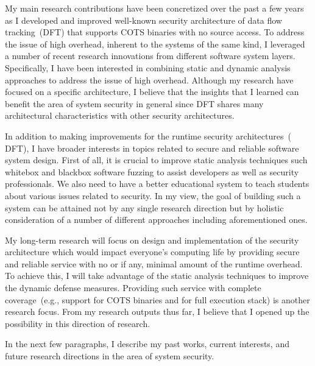 \documentclass[letterpaper, 10pt]{article}
\begin{document}
\begin{small}
My main research contributions have been concretized over the past a few years
as I developed and improved well-known security architecture of data flow
tracking~(DFT) that supports COTS binaries with no source access.
%
To address the issue of high overhead, inherent to the systems of the same
kind, I leveraged a number of recent research innovations from different
software system layers. Specifically, I have been interested in combining
static and dynamic analysis approaches to address the issue of high overhead.
%
Although my research have focused on a specific architecture, I believe that
the insights that I learned can benefit the area of system security in general
since DFT shares many architectural characteristics with other security
architectures.

In addition to making improvements for the runtime security architectures~(\ie
DFT), I have broader interests in topics related to secure and reliable
software system design.
%
First of all, it is crucial to improve static analysis techniques such whitebox
and blackbox software fuzzing to assist developers as well as security
professionals. 
%
We also need to have a better educational system to teach students about
various issues related to security.
%
In my view, the goal of building such a system can be attained not by any
single research direction but by holistic consideration of a number of
different approaches including aforementioned ones.

My long-term research will focus on design and implementation of the security
architecture which would impact everyone's computing life by providing secure
and reliable service with no or if any, minimal amount of the runtime overhead.
To achieve this, I will take advantage of the static analysis techniques to
improve the dynamic defense measures. 
%
%
%
Providing such service with complete coverage~(e.g., support for COTS
binaries and for full execution stack) is another research focus.
%
From my research outputs thus far, I believe that I opened up the possibility
in this direction of research.

In the next few paragraphs, I describe my past works, current interests, and
future research directions in the area of system security.


\end{small}
\end{document}
